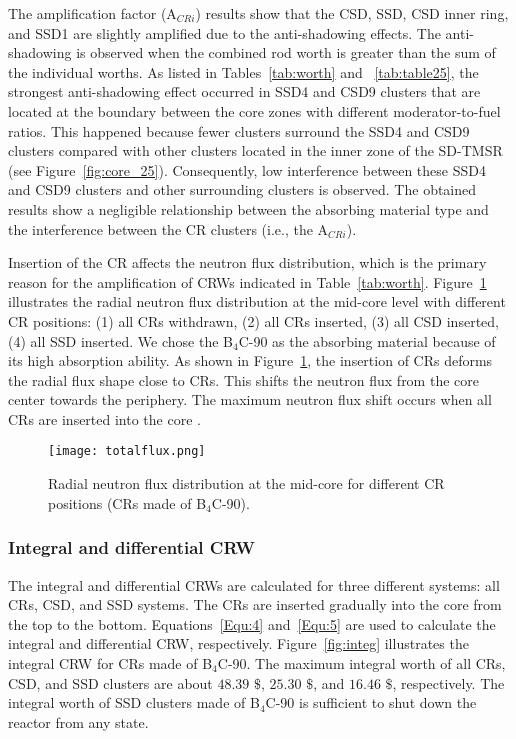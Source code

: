 The amplification factor (A$_{CRi}$) results show that the CSD, SSD, CSD inner 
ring, and SSD1 are slightly amplified due to the anti-shadowing effects. The 
anti-shadowing is observed when the combined rod worth is greater than the sum 
of the individual worths. As listed in Tables~\ref{tab:worth} and ~\ref{tab:table25}, the strongest anti-shadowing effect occurred in 
SSD4 and CSD9 clusters that are located at the boundary between the core zones 
with different moderator-to-fuel ratios. This happened because fewer clusters surround the SSD4 and CSD9 clusters compared with other clusters located in the inner zone of the SD-TMSR (see Figure~\ref{fig:core_25}). Consequently, low interference between these SSD4 and CSD9 clusters and other surrounding clusters is observed. The obtained results show a negligible relationship between the absorbing material type and the interference between the CR clusters (i.e., the A$_{CRi}$).

Insertion of the CR affects the neutron flux distribution, which is 
the primary reason for the amplification of CRWs indicated in 
Table~\ref{tab:worth}. Figure~\ref{fig:totalflux} illustrates the radial 
neutron flux distribution at the mid-core level with different CR positions: 
(1) all CRs withdrawn, (2) all CRs inserted, (3) all CSD inserted, (4) all SSD 
inserted. We chose the B$_4$C-90 as the absorbing material because of its high 
absorption ability. As shown in Figure~\ref{fig:totalflux}, the insertion of 
CRs deforms the radial flux shape close to CRs.
This shifts the neutron flux from the core center towards the 
periphery. The maximum neutron flux shift occurs when all CRs are inserted 
into the core \cite{girardin2007control}.
\begin{figure}[!ht]
	\centering
	\texttt{[image: totalflux.png]}
	\vspace{-0.5in}
	\caption{Radial neutron flux distribution at the mid-core for different 
	CR positions (CRs made of B$_4$C-90).} 
	\label{fig:totalflux}
\end{figure}
 

\subsubsection{Integral and differential CRW}

The integral and differential CRWs are calculated for three 
different systems: all CRs, CSD, and SSD systems. The CRs are 
inserted gradually into the core from the top to the bottom. 
Equations~\ref{Equ:4} and~\ref{Equ:5} are used to calculate the integral and 
differential CRW, respectively. Figure~\ref{fig:integ} illustrates the integral CRW for CRs 
made of B$_4$C-90. The maximum integral worth of all CRs, CSD, and SSD 
clusters are about $48.39$ $\$$, $25.30$ $\$$, and $16.46$ $\$$, respectively. The 
integral worth of SSD clusters made of B$_4$C-90 is sufficient to shut down the reactor from any 
state.

